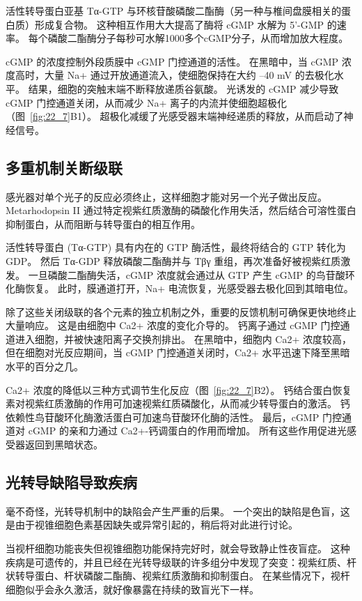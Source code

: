 活性转导蛋白亚基 Tα-GTP 与环核苷酸磷酸二酯酶（另一种与椎间盘膜相关的蛋白质）形成复合物。
这种相互作用大大提高了酶将 cGMP 水解为 5'-GMP 的速率。
每个磷酸二酯酶分子每秒可水解1000多个cGMP分子，从而增加放大程度。


cGMP 的浓度控制外段质膜中 cGMP 门控通道的活性。
在黑暗中，当 cGMP 浓度高时，大量 Na+ 通过开放通道流入，使细胞保持在大约 –40 mV 的去极化水平。
结果，细胞的突触末端不断释放递质谷氨酸。
光诱发的 cGMP 减少导致 cGMP 门控通道关闭，从而减少 Na+ 离子的内流并使细胞超极化（图~\ref{fig:22_7}B1）。
超极化减缓了光感受器末端神经递质的释放，从而启动了神经信号。



\subsection{多重机制关断级联}

感光器对单个光子的反应必须终止，这样细胞才能对另一个光子做出反应。
Metarhodopsin II 通过特定视紫红质激酶的磷酸化作用失活，然后结合可溶性蛋白抑制蛋白，从而阻断与转导蛋白的相互作用。


活性转导蛋白 (Tα-GTP) 具有内在的 GTP 酶活性，最终将结合的 GTP 转化为 GDP。
然后 Tα-GDP 释放磷酸二酯酶并与 Tβγ 重组，再次准备好被视紫红质激发。
一旦磷酸二酯酶失活，cGMP 浓度就会通过从 GTP 产生 cGMP 的鸟苷酸环化酶恢复。
此时，膜通道打开，Na+ 电流恢复，光感受器去极化回到其暗电位。


除了这些关闭级联的各个元素的独立机制之外，重要的反馈机制可确保更快地终止大量响应。
这是由细胞中 Ca2+ 浓度的变化介导的。
钙离子通过 cGMP 门控通道进入细胞，并被快速阳离子交换剂排出。
在黑暗中，细胞内 Ca2+ 浓度较高，但在细胞对光反应期间，当 cGMP 门控通道关闭时，Ca2+ 水平迅速下降至黑暗水平的百分之几。


Ca2+ 浓度的降低以三种方式调节生化反应（图~\ref{fig:22_7}B2）。
钙结合蛋白恢复素对视紫红质激酶的作用可加速视紫红质磷酸化，从而减少转导蛋白的激活。
钙依赖性鸟苷酸环化酶激活蛋白可加速鸟苷酸环化酶的活性。
最后，cGMP 门控通道对 cGMP 的亲和力通过 Ca2+-钙调蛋白的作用而增加。
所有这些作用促进光感受器返回到黑暗状态。



\subsection{光转导缺陷导致疾病}

毫不奇怪，光转导机制中的缺陷会产生严重的后果。
一个突出的缺陷是色盲，这是由于视锥细胞色素基因缺失或异常引起的，稍后将对此进行讨论。


当视杆细胞功能丧失但视锥细胞功能保持完好时，就会导致静止性夜盲症。
这种疾病是可遗传的，并且已经在光转导级联的许多组分中发现了突变：视紫红质、杆状转导蛋白、杆状磷酸二酯酶、视紫红质激酶和抑制蛋白。
在某些情况下，视杆细胞似乎会永久激活，就好像暴露在持续的致盲光下一样。



